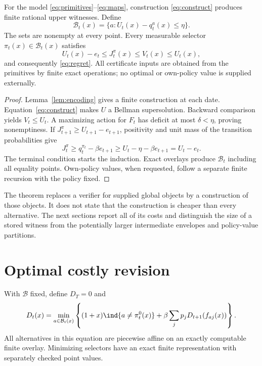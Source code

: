 \begin{theorem}\label{thm:constructive}
For the model \eqref{eq:primitives}--\eqref{eq:maps}, construction \eqref{eq:construct} produces finite rational upper witnesses. Define
\begin{equation}\label{eq:allowed}
 \mathcal B_t(x)=\{a:U_t(x)-q_t^a(x)\le\eta\}.
\end{equation}
The sets are nonempty at every point. Every measurable selector $\pi_t(x)\in\mathcal B_t(x)$ satisfies
\begin{equation}\label{eq:order}
 U_t(x)-e_t\le J_t^\pi(x)\le V_t(x)\le U_t(x),
\end{equation}
and consequently \eqref{eq:regret}. All certificate inputs are obtained from the primitives by finite exact operations; no optimal or own-policy value is supplied externally.
\end{theorem}
\begin{proof}
Lemma~\ref{lem:encoding} gives a finite construction at each date. Equation~\eqref{eq:construct} makes $U$ a Bellman supersolution. Backward comparison yields $V_t\le U_t$. A maximizing action for $F_t$ has deficit at most $\delta<\eta$, proving nonemptiness. If $J_{t+1}^\pi\ge U_{t+1}-e_{t+1}$, positivity and unit mass of the transition probabilities give
\[
 J_t^\pi\ge q_t^{\pi_t}-\beta e_{t+1}\ge U_t-\eta-\beta e_{t+1}=U_t-e_t.
\]
The terminal condition starts the induction. Exact overlays produce $\mathcal B_t$ including all equality points. Own-policy values, when requested, follow a separate finite recursion with the policy fixed.\end{proof}

The theorem replaces a verifier for supplied global objects by a construction of those objects. It does not state that the construction is cheaper than every alternative. The next sections report all of its costs and distinguish the size of a stored witness from the potentially larger intermediate envelopes and policy-value partitions.

\section{Optimal costly revision}\label{sec:revision}
With $\mathcal B$ fixed, define $D_T=0$ and
\begin{equation}\label{eq:costdp}
 D_t(x)=\min_{a\in\mathcal B_t(x)}\left\{
 (1+x)\ind\{a\ne\pi_t^0(x)\}+\beta\sum_jp_jD_{t+1}(f_{aj}(x))\right\}.
\end{equation}
All alternatives in this equation are piecewise affine on an exactly computable finite overlay. Minimizing selectors have an exact finite representation with separately checked point values.

